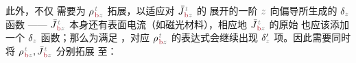 此外，不仅  需要为 ${\rho}^{\;\!\mathcolor{gray}{t}}_{\;\!\textcolor{Maroon}{\text{b}}\mathcolor{gray}{z}}$ 拓展，以适应对 $\bar{J}^{\;\!\mathcolor{gray}{t}}_{\;\!\textcolor{Maroon}{\text{b}}\mathcolor{gray}{z}}$ 的  展开的一阶 $\mathcolor{gray}{z}$ 向偏导所生成的 $\delta_{\mathcolor{gray}{z}}$ 函数 —— $\bar{J}^{\;\!\mathcolor{gray}{t}}_{\;\!\textcolor{Maroon}{\text{b}}\mathcolor{gray}{z}}$ 本身还有表面电流（如磁光材料），相应地 $\bar{J}^{\;\!\mathcolor{gray}{t}}_{\;\!\textcolor{Maroon}{\text{b}}\mathcolor{gray}{z}}$ 的原始  也应该添加一个 $\delta_{\mathcolor{gray}{z}}$ 函数；那么为满足 ，对应 ${\rho}^{\;\!\mathcolor{gray}{t}}_{\;\!\textcolor{Maroon}{\text{b}}\mathcolor{gray}{z}}$ 的表达式会继续出现 $\delta'_{\mathcolor{gray}{z}}$ 项。因此需要同时将 ${\rho}^{\;\!\mathcolor{gray}{t}}_{\;\!\textcolor{Maroon}{\text{b}}\mathcolor{gray}{z}},\bar{J}^{\;\!\mathcolor{gray}{t}}_{\;\!\textcolor{Maroon}{\text{b}}\mathcolor{gray}{z}}$ 分别拓展  至：
